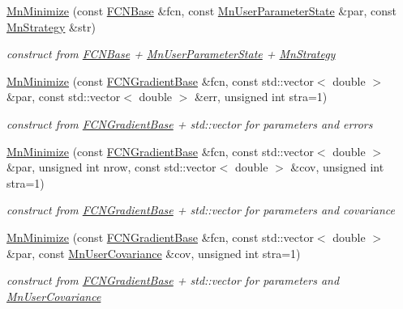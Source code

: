 \begin{DoxyCompactItemize}
\mbox{\hyperlink{classROOT_1_1Minuit2_1_1MnMinimize_ac07d9fb89fb1a8cdef14ece12eabbfda}{Mn\+Minimize}} (const \mbox{\hyperlink{classROOT_1_1Minuit2_1_1FCNBase}{F\+C\+N\+Base}} \&fcn, const \mbox{\hyperlink{classROOT_1_1Minuit2_1_1MnUserParameterState}{Mn\+User\+Parameter\+State}} \&par, const \mbox{\hyperlink{classROOT_1_1Minuit2_1_1MnStrategy}{Mn\+Strategy}} \&str)
\begin{DoxyCompactList}\small\item\em construct from \mbox{\hyperlink{classROOT_1_1Minuit2_1_1FCNBase}{F\+C\+N\+Base}} + \mbox{\hyperlink{classROOT_1_1Minuit2_1_1MnUserParameterState}{Mn\+User\+Parameter\+State}} + \mbox{\hyperlink{classROOT_1_1Minuit2_1_1MnStrategy}{Mn\+Strategy}} \end{DoxyCompactList}\item 
\mbox{\hyperlink{classROOT_1_1Minuit2_1_1MnMinimize_a838683666517f1099a8eff7654dff3e2}{Mn\+Minimize}} (const \mbox{\hyperlink{classROOT_1_1Minuit2_1_1FCNGradientBase}{F\+C\+N\+Gradient\+Base}} \&fcn, const std\+::vector$<$ double $>$ \&par, const std\+::vector$<$ double $>$ \&err, unsigned int stra=1)
\begin{DoxyCompactList}\small\item\em construct from \mbox{\hyperlink{classROOT_1_1Minuit2_1_1FCNGradientBase}{F\+C\+N\+Gradient\+Base}} + std\+::vector for parameters and errors \end{DoxyCompactList}\item 
\mbox{\hyperlink{classROOT_1_1Minuit2_1_1MnMinimize_ad3e1fd3c735a330f90f37e8e4ac3efce}{Mn\+Minimize}} (const \mbox{\hyperlink{classROOT_1_1Minuit2_1_1FCNGradientBase}{F\+C\+N\+Gradient\+Base}} \&fcn, const std\+::vector$<$ double $>$ \&par, unsigned int nrow, const std\+::vector$<$ double $>$ \&cov, unsigned int stra=1)
\begin{DoxyCompactList}\small\item\em construct from \mbox{\hyperlink{classROOT_1_1Minuit2_1_1FCNGradientBase}{F\+C\+N\+Gradient\+Base}} + std\+::vector for parameters and covariance \end{DoxyCompactList}\item 
\mbox{\hyperlink{classROOT_1_1Minuit2_1_1MnMinimize_a4f00e31f1d1bd5bd1e8771d9434eb3f7}{Mn\+Minimize}} (const \mbox{\hyperlink{classROOT_1_1Minuit2_1_1FCNGradientBase}{F\+C\+N\+Gradient\+Base}} \&fcn, const std\+::vector$<$ double $>$ \&par, const \mbox{\hyperlink{classROOT_1_1Minuit2_1_1MnUserCovariance}{Mn\+User\+Covariance}} \&cov, unsigned int stra=1)
\begin{DoxyCompactList}\small\item\em construct from \mbox{\hyperlink{classROOT_1_1Minuit2_1_1FCNGradientBase}{F\+C\+N\+Gradient\+Base}} + std\+::vector for parameters and \mbox{\hyperlink{classROOT_1_1Minuit2_1_1MnUserCovariance}{Mn\+User\+Covariance}} \end{DoxyCompactList}\item 

\end{DoxyCompactItemize}
